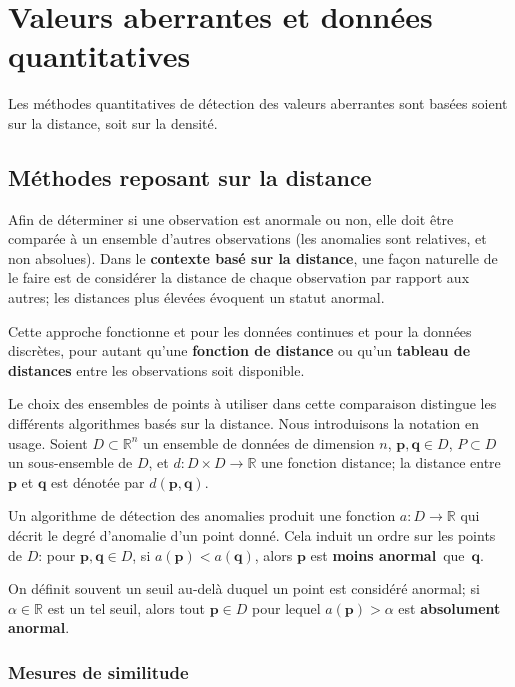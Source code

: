 \newpage
\section{Valeurs aberrantes et donn\'ees quantitatives}\label{Section:2}
Les méthodes quantitatives de d\'etection des valeurs aberrantes sont bas\'ees soient sur la distance, soit sur la densité. 
\subsection{Méthodes reposant sur la distance}
Afin de déterminer si une observation est anormale ou non, elle doit être comparée à un ensemble d'autres observations (les anomalies sont relatives, et non absolues). Dans le \textbf{contexte basé sur la distance}, une façon naturelle de le faire est de considérer la distance de chaque observation par rapport aux autres; les distances plus \'elev\'ees évoquent un statut anormal.

Cette approche fonctionne et pour les donn\'ees continues et pour la donn\'ees discr\`etes, pour autant qu'une \textbf{fonction de distance} ou qu'un \textbf{tableau de distances} entre les observations soit disponible. 

Le choix des ensembles de points à utiliser dans cette comparaison distingue les différents algorithmes basés sur la distance.
\newl Nous introduisons la notation en usage. Soient $D \subset \mathbb{R}^n$ un ensemble de donn\'ees de dimension $n$, 
$\mathbf{p},\mathbf{q}\in D$, 
$P \subset D$ un sous-ensemble de $D$, et $d: D \times D \to \mathbb{R}$ une fonction distance; la distance entre  $\mathbf{p}$ et $\mathbf{q}$ est d\'enot\'ee par  $d(\mathbf{p},\mathbf{q})$.

Un algorithme de détection des anomalies produit une fonction $a : D \to \mathbb{R}$ qui décrit le degré d'anomalie d'un point donné. Cela induit un ordre sur les points de $D$: pour $\mathbf{p},\mathbf{q} \in D$, si $a(\mathbf{p}) < a(\mathbf{q})$, alors $\mathbf{p}$ est \textbf{moins anormal}~que~$\mathbf{q}$.

On définit souvent un seuil au-delà duquel un point est considéré anormal; si $\alpha \in \mathbb{R}$ est un tel seuil, alors tout $\mathbf{p} \in D$ pour lequel $a(\mathbf{p}) > \alpha$ est \textbf{absolument anormal}.

\subsubsection*{Mesures de similitude}

